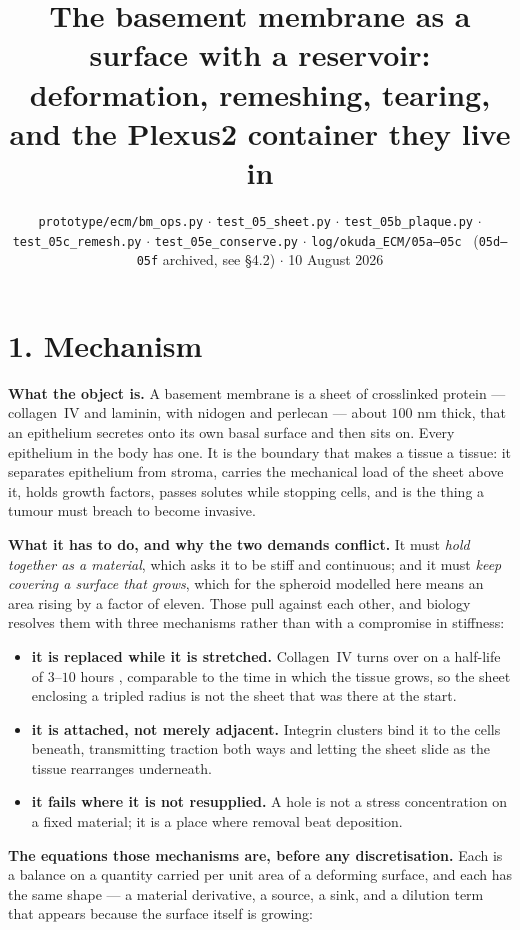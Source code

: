 \documentclass[10pt,a4paper]{article}
\title{\vspace{-1.4cm}\textbf{The basement membrane as a surface with a reservoir:\\
\normalsize deformation, remeshing, tearing, and the Plexus2 container they live in}}
\author{}
\date{\vspace{-0.9cm}\small \texttt{prototype/ecm/bm\_ops.py} $\cdot$
\texttt{test\_05\_sheet.py} $\cdot$ \texttt{test\_05b\_plaque.py} $\cdot$
\texttt{test\_05c\_remesh.py} $\cdot$ \texttt{test\_05e\_conserve.py} $\cdot$
\texttt{log/okuda\_ECM/05a--05c} \ (\texttt{05d--05f} archived, see \S4.2) $\cdot$ 10 August 2026}
\begin{document}
\maketitle\vspace{-1.0cm}

\section*{1.\; Mechanism}

\textbf{What the object is.} A basement membrane is a sheet of crosslinked protein --- collagen~IV
and laminin, with nidogen and perlecan --- about $100$ nm thick, that an epithelium secretes onto its
own basal surface and then sits on. Every epithelium in the body has one. It is the boundary that
makes a tissue a tissue: it separates epithelium from stroma, carries the mechanical load of the sheet
above it, holds growth factors, passes solutes while stopping cells, and is the thing a tumour must
breach to become invasive.

\textbf{What it has to do, and why the two demands conflict.} It must \emph{hold together as a
material}, which asks it to be stiff and continuous; and it must \emph{keep covering a surface that
grows}, which for the spheroid modelled here means an area rising by a factor of eleven. Those pull
against each other, and biology resolves them with three mechanisms rather than with a compromise in
stiffness:

\begin{itemize}\itemsep1pt
\item \textbf{it is replaced while it is stretched.} Collagen~IV turns over on a half-life of
      $3$--$10$ hours \cite{matsubayashi2020}, comparable to the time in which the tissue grows, so the
      sheet enclosing a tripled radius is not the sheet that was there at the start.
\item \textbf{it is attached, not merely adjacent.} Integrin clusters bind it to the cells beneath,
      transmitting traction both ways and letting the sheet slide as the tissue rearranges underneath.
\item \textbf{it fails where it is not resupplied.} A hole is not a stress concentration on a fixed
      material; it is a place where removal beat deposition.
\end{itemize}

\textbf{The equations those mechanisms are, before any discretisation.} Each is a balance on a
quantity carried per unit area of a deforming surface, and each has the same shape --- a material
derivative, a source, a sink, and a dilution term that appears because the surface itself is growing:
\end{document}

